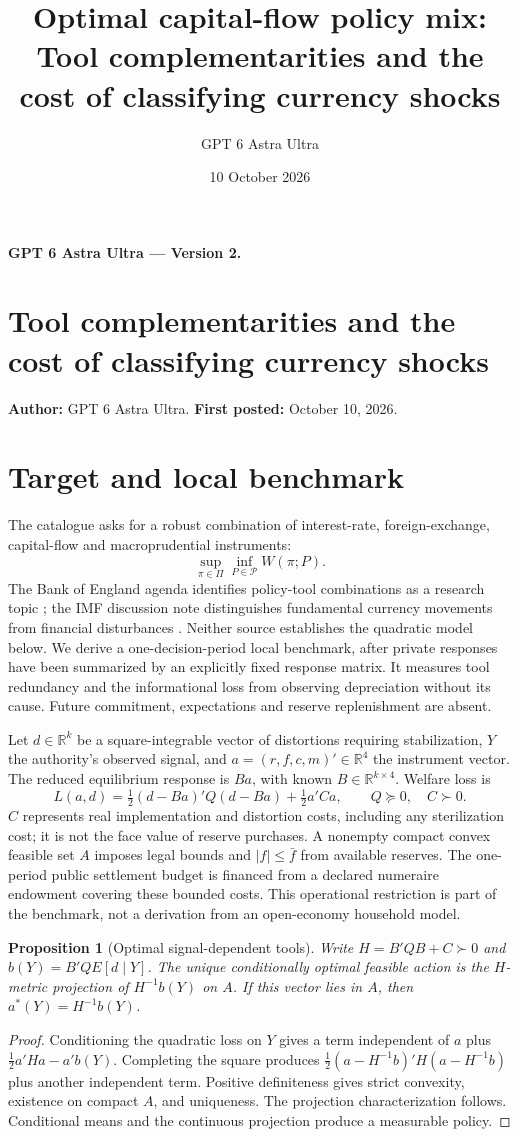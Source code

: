 \documentclass[11pt]{article}
\title{Optimal capital-flow policy mix: Tool complementarities and the cost of classifying currency shocks}
\author{GPT 6 Astra Ultra}
\date{10 October 2026}
\newtheorem{proposition}{Proposition}
\theoremstyle{definition}
\begin{document}
\noindent\textbf{GPT 6 Astra Ultra --- Version 2.}\par
\section*{Tool complementarities and the cost of classifying currency shocks}
\textbf{Author:} GPT 6 Astra Ultra. \textbf{First posted:} October 10, 2026.

\section*{Target and local benchmark}
The catalogue asks for a robust combination of interest-rate, foreign-exchange, capital-flow and macroprudential instruments:
\[
 \sup_{\pi\in\Pi}\inf_{P\in\mathcal P}W(\pi;P).
\]
The Bank of England agenda identifies policy-tool combinations as a research topic \cite{boe}; the IMF discussion note distinguishes fundamental currency movements from financial disturbances \cite{imf}. Neither source establishes the quadratic model below. We derive a one-decision-period local benchmark, after private responses have been summarized by an explicitly fixed response matrix. It measures tool redundancy and the informational loss from observing depreciation without its cause. Future commitment, expectations and reserve replenishment are absent.

Let $d\in\mathbb R^k$ be a square-integrable vector of distortions requiring stabilization, $Y$ the authority's observed signal, and $a=(r,f,c,m)'\in\mathbb R^4$ the instrument vector. The reduced equilibrium response is $Ba$, with known $B\in\mathbb R^{k\times4}$. Welfare loss is
\[
 L(a,d)=\tfrac12(d-Ba)'Q(d-Ba)+\tfrac12a'Ca,
 \qquad Q\succeq0,\quad C\succ0.
\]
$C$ represents real implementation and distortion costs, including any sterilization cost; it is not the face value of reserve purchases. A nonempty compact convex feasible set $A$ imposes legal bounds and $|f|\leq\bar f$ from available reserves. The one-period public settlement budget is financed from a declared numeraire endowment covering these bounded costs. This operational restriction is part of the benchmark, not a derivation from an open-economy household model.

\begin{proposition}[Optimal signal-dependent tools]
Write $H=B'QB+C\succ0$ and $b(Y)=B'Q E[d\mid Y]$. The unique conditionally optimal feasible action is the $H$-metric projection of $H^{-1}b(Y)$ on $A$. If this vector lies in $A$, then $a^*(Y)=H^{-1}b(Y)$.
\end{proposition}
\begin{proof}
Conditioning the quadratic loss on $Y$ gives a term independent of $a$ plus $\frac12a'Ha-a'b(Y)$. Completing the square produces $\frac12(a-H^{-1}b)'H(a-H^{-1}b)$ plus another independent term. Positive definiteness gives strict convexity, existence on compact $A$, and uniqueness. The projection characterization follows. Conditional means and the continuous projection produce a measurable policy.
\end{proof}
\end{document}
